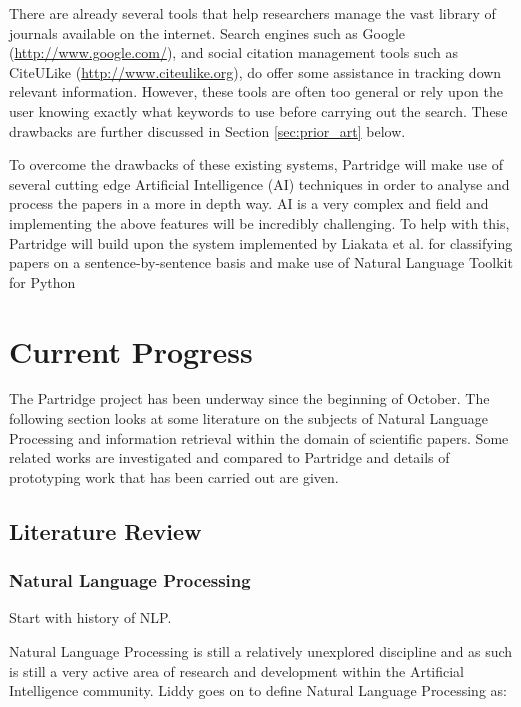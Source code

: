 \documentclass[12pt,a4paper]{article}
\begin{document}
There are already several tools that help researchers manage the vast library
of journals available on the internet. Search engines such as Google
({\url{http://www.google.com/}}), and social citation management tools such as
CiteULike ({\url{http://www.citeulike.org}}), do offer some assistance in
tracking down relevant information. However, these tools are often too general
or rely upon the user knowing exactly what keywords to use before carrying out
the search. These drawbacks are further discussed in Section
\ref{sec:prior_art} below.

To overcome the drawbacks of these existing systems, Partridge will make use of
several cutting edge Artificial Intelligence (AI) techniques in order to analyse and
process the papers in a more in depth way. AI is a very complex and field and
implementing the above features will be incredibly challenging. To help with
this, Partridge will build upon the system implemented by Liakata et al. for
classifying papers on a sentence-by-sentence basis\cite{citeulike:10444769} and
make use of Natural Language Toolkit for Python
\cite{Bird:2006:NNL:1225403.1225421} 

\section{Current Progress}

The Partridge project has been underway since the beginning of October. The
following section looks at some literature on the subjects of Natural Language
Processing and information retrieval within the domain of scientific papers.
Some related works are investigated and compared to Partridge and details of
prototyping work that has been carried out are given.

\subsection{Literature Review}

\subsubsection{Natural Language Processing} 

Start with history of NLP.

Natural Language Processing is
still a relatively unexplored discipline and as such is still a very active
area of research and development within the Artificial Intelligence
community\cite{liddy2001natural}. Liddy goes on to define Natural Language
Processing as:
\end{document}
